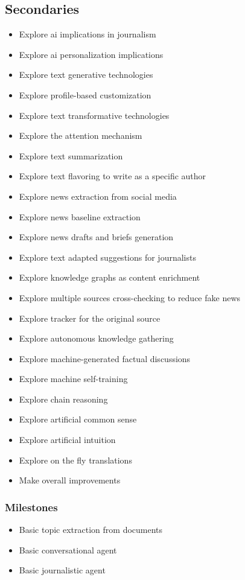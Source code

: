 \subsection{Secondaries}
\begin{itemize}
    \setlength\itemsep{0em}
    \item Explore \gls{ai} implications in journalism
    \item Explore \gls{ai} personalization implications
    \item Explore text generative technologies
    \item Explore profile-based customization
    \item Explore text transformative technologies
    \item Explore the attention mechanism
    \item Explore text summarization
    \item Explore text flavoring to write as a specific author
    \item Explore news extraction from social media
    \item Explore news baseline extraction
    \item Explore news drafts and briefs generation
    \item Explore text adapted suggestions for journalists
    \item Explore knowledge graphs as content enrichment
    \item Explore multiple sources cross-checking to reduce fake news
    \item Explore tracker for the original source
    \item Explore autonomous knowledge gathering
    \item Explore machine-generated factual discussions
    \item Explore machine self-training
    \item Explore chain reasoning
    \item Explore artificial common sense
    \item Explore artificial intuition
    \item Explore on the fly translations
    \item Make overall improvements
\end{itemize}
\subsubsection{Milestones}
\begin{itemize}
    \setlength\itemsep{0em}
    \item Basic topic extraction from documents
    \item Basic conversational agent
    \item Basic journalistic agent
\end{itemize}
